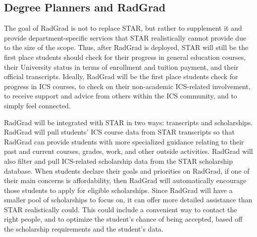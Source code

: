\subsection{Degree Planners and RadGrad}
The goal of RadGrad is not to replace STAR, but rather to supplement it and provide department-specific services that STAR realistically cannot provide due to the size of the scope. Thus, after RadGrad is deployed, STAR will still be the first place students should check for their progress in general education courses, their University status in terms of enrollment and tuition payment, and their official transcripts. Ideally, RadGrad will be the first place students check for progress in ICS courses, to check on their non-academic ICS-related involvement, to receive support and advice from others within the ICS community, and to simply feel connected. 

RadGrad will be integrated with STAR in two ways: transcripts and scholarships. RadGrad will pull students' ICS course data from STAR transcripts so that RadGrad can provide students with more specialized guidance relating to their past and current courses, grades, work, and other outside activities. RadGrad will also filter and pull ICS-related scholarship data from the STAR scholarship database. When students declare their goals and priorities on RadGrad, if one of their main concerns is affordability, then RadGrad will automatically encourage those students to apply for eligible scholarships. Since RadGrad will have a smaller pool of scholarships to focus on, it can offer more detailed assistance than STAR realistically could. This could include a convenient way to contact the right people, and to optimize the student's chance of being accepted, based off the scholarship requirements and the student's data. 

